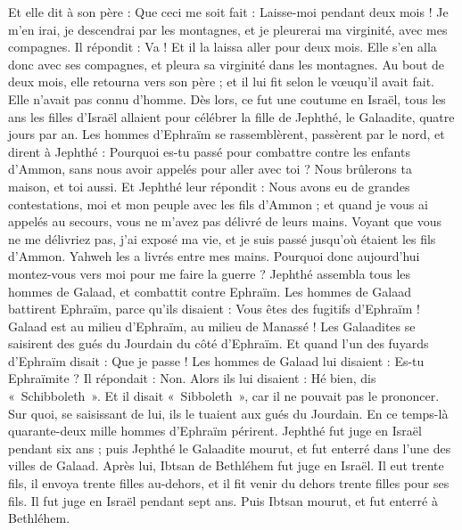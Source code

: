 \begin{multicols}{2}
Et elle dit à son père : Que ceci me soit fait : Laisse-moi pendant deux mois ! Je m'en irai, je descendrai par les montagnes, et je pleurerai ma virginité, avec mes compagnes.
Il répondit : Va ! Et il la laissa aller pour deux mois. Elle s'en alla donc avec ses compagnes, et pleura sa virginité dans les montagnes.
Au bout de deux mois, elle retourna vers son père ; et il lui fit selon le vœuqu'il avait fait. Elle n'avait pas connu d'homme. Dès lors, ce fut une coutume en Israël,
tous les ans les filles d'Israël allaient pour célébrer la fille de Jephthé, le Galaadite, quatre jours par an.
\VerseOne{}Les hommes d'Ephraïm se rassemblèrent, passèrent par le nord, et dirent à Jephthé : Pourquoi es-tu passé pour combattre contre les enfants d'Ammon, sans nous avoir appelés pour aller avec toi ? Nous brûlerons ta maison, et toi aussi.
Et Jephthé leur répondit : Nous avons eu de grandes contestations, moi et mon peuple avec les fils d'Ammon ; et quand je vous ai appelés au secours, vous ne m'avez pas délivré de leurs mains.
Voyant que vous ne me délivriez pas, j'ai exposé ma vie, et je suis passé jusqu'où étaient les fils d'Ammon. Yahweh les a livrés entre mes mains. Pourquoi donc aujourd'hui montez-vous vers moi pour me faire la guerre ?
Jephthé assembla tous les hommes de Galaad, et combattit contre Ephraïm. Les hommes de Galaad battirent Ephraïm, parce qu'ils disaient : Vous êtes des fugitifs d'Ephraïm ! Galaad est au milieu d'Ephraïm, au milieu de Manassé !
Les Galaadites se saisirent des gués du Jourdain du côté d'Ephraïm. Et quand l'un des fuyards d'Ephraïm disait : Que je passe ! Les hommes de Galaad lui disaient : Es-tu Ephraïmite ? Il répondait : Non.
Alors ils lui disaient : Hé bien, dis «~Schibboleth~». Et il disait «~Sibboleth~», car il ne pouvait pas le prononcer. Sur quoi, se saisissant de lui, ils le tuaient aux gués du Jourdain. En ce temps-là quarante-deux mille hommes d'Ephraïm périrent.
Jephthé fut juge en Israël pendant six ans ; puis Jephthé le Galaadite mourut, et fut enterré dans l'une des villes de Galaad.
Après lui, Ibtsan de Bethléhem fut juge en Israël.
Il eut trente fils, il envoya trente filles au-dehors, et il fit venir du dehors trente filles pour ses fils. Il fut juge en Israël pendant sept ans.
Puis Ibtsan mourut, et fut enterré à Bethléhem.

\end{multicols}
